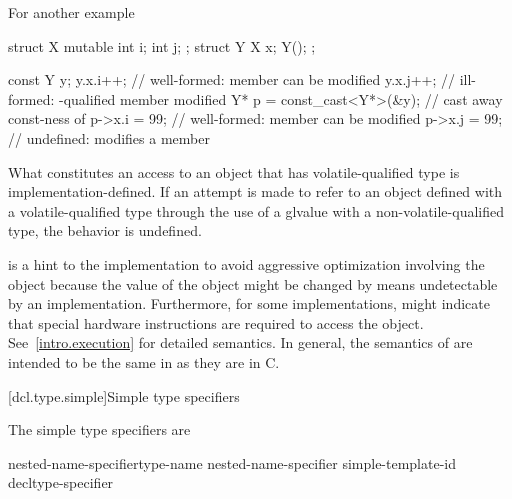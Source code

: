 \pnum
For another example

\begin{codeblock}
struct X {
  mutable int i;
  int j;
};
struct Y {
  X x;
  Y();
};

const Y y;
y.x.i++;                        // well-formed:  member can be modified
y.x.j++;                        // ill-formed: -qualified member modified
Y* p = const_cast<Y*>(&y);      // cast away const-ness of 
p->x.i = 99;                    // well-formed:  member can be modified
p->x.j = 99;                    // undefined: modifies a  member
\end{codeblock}
\exitexample

\pnum
What constitutes an access to an object that has volatile-qualified type is
implementation-defined.
If an attempt is made to refer to an object defined with a
volatile-qualified type through the use of a glvalue with a
non-volatile-qualified type, the behavior is undefined.

\pnum
{}%
%
\enternote
{} is a hint to the implementation to avoid aggressive
optimization involving the object because the value of the object might
be changed by means undetectable by an implementation.
Furthermore, for some implementations,  might indicate that
special hardware instructions are required to access the object.
See~\ref{intro.execution} for detailed semantics. In general, the
semantics of  are intended to be the same in \Cpp as
they are in C.
\exitnote

[dcl.type.simple]{Simple type specifiers}%

\pnum
The simple type specifiers are

\begin{bnf}
\br
    nested-name-specifier\opt type-name\br
    nested-name-specifier  simple-template-id\br
    \br
    \br
    \br
    \br
    \br
    \br
    \br
    \br
    \br
    \br
    \br
    \br
    \br
    \br
    decltype-specifier
\end{bnf}

